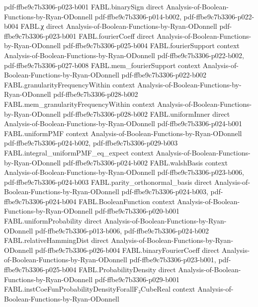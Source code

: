 \begin{theorem}
  {pdf-ffbe9c7b3306-p023-b001}
\proofstep
  {FABL.binarySign}
  {direct}
  {Analysis-of-Boolean-Functions-by-Ryan-ODonnell}
  {pdf-ffbe9c7b3306-p014-b002,
    pdf-ffbe9c7b3306-p022-b004}
\proofstep
  {FABL.χ}
  {direct}
  {Analysis-of-Boolean-Functions-by-Ryan-ODonnell}
  {pdf-ffbe9c7b3306-p023-b001}
\proofstep
  {FABL.fourierCoeff}
  {direct}
  {Analysis-of-Boolean-Functions-by-Ryan-ODonnell}
  {pdf-ffbe9c7b3306-p025-b004}
\proofstep
  {FABL.fourierSupport}
  {context}
  {Analysis-of-Boolean-Functions-by-Ryan-ODonnell}
  {pdf-ffbe9c7b3306-p022-b002,
    pdf-ffbe9c7b3306-p027-b008}
\proofstep
  {FABL.mem_fourierSupport}
  {context}
  {Analysis-of-Boolean-Functions-by-Ryan-ODonnell}
  {pdf-ffbe9c7b3306-p022-b002}
\proofstep
  {FABL.granularityFrequencyWithin}
  {context}
  {Analysis-of-Boolean-Functions-by-Ryan-ODonnell}
  {pdf-ffbe9c7b3306-p028-b002}
\proofstep
  {FABL.mem_granularityFrequencyWithin}
  {context}
  {Analysis-of-Boolean-Functions-by-Ryan-ODonnell}
  {pdf-ffbe9c7b3306-p028-b002}
\proofstep
  {FABL.uniformInner}
  {direct}
  {Analysis-of-Boolean-Functions-by-Ryan-ODonnell}
  {pdf-ffbe9c7b3306-p024-b001}
\proofstep
  {FABL.uniformPMF}
  {context}
  {Analysis-of-Boolean-Functions-by-Ryan-ODonnell}
  {pdf-ffbe9c7b3306-p024-b002,
    pdf-ffbe9c7b3306-p029-b003}
\proofstep
  {FABL.integral_uniformPMF_eq_expect}
  {context}
  {Analysis-of-Boolean-Functions-by-Ryan-ODonnell}
  {pdf-ffbe9c7b3306-p024-b002}
\proofstep
  {FABL.walshBasis}
  {context}
  {Analysis-of-Boolean-Functions-by-Ryan-ODonnell}
  {pdf-ffbe9c7b3306-p023-b006,
    pdf-ffbe9c7b3306-p024-b003}
\proofstep
  {FABL.parity_orthonormal_basis}
  {direct}
  {Analysis-of-Boolean-Functions-by-Ryan-ODonnell}
  {pdf-ffbe9c7b3306-p024-b003,
    pdf-ffbe9c7b3306-p024-b004}
\proofstep
  {FABL.BooleanFunction}
  {context}
  {Analysis-of-Boolean-Functions-by-Ryan-ODonnell}
  {pdf-ffbe9c7b3306-p020-b001}
\proofstep
  {FABL.uniformProbability}
  {direct}
  {Analysis-of-Boolean-Functions-by-Ryan-ODonnell}
  {pdf-ffbe9c7b3306-p013-b006,
    pdf-ffbe9c7b3306-p024-b002}
\proofstep
  {FABL.relativeHammingDist}
  {direct}
  {Analysis-of-Boolean-Functions-by-Ryan-ODonnell}
  {pdf-ffbe9c7b3306-p026-b004}
\proofstep
  {FABL.binaryFourierCoeff}
  {direct}
  {Analysis-of-Boolean-Functions-by-Ryan-ODonnell}
  {pdf-ffbe9c7b3306-p023-b001,
    pdf-ffbe9c7b3306-p025-b004}
\proofstep
  {FABL.ProbabilityDensity}
  {direct}
  {Analysis-of-Boolean-Functions-by-Ryan-ODonnell}
  {pdf-ffbe9c7b3306-p029-b001}
\proofstep
  {FABL.instCoeFunProbabilityDensityForallF₂CubeReal}
  {context}
  {Analysis-of-Boolean-Functions-by-Ryan-ODonnell}

\end{theorem}

